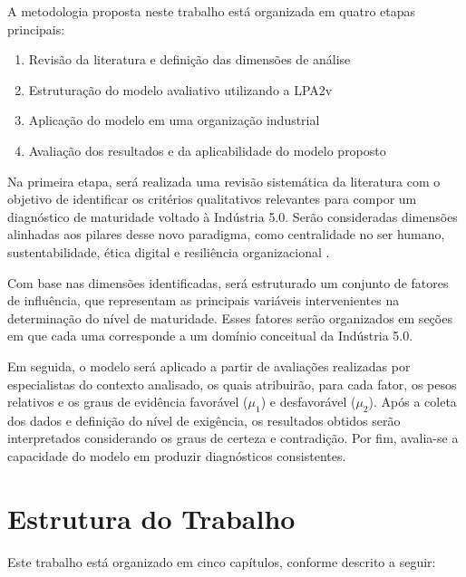 A metodologia proposta neste trabalho está organizada em quatro etapas principais:
\begin{enumerate}[label=\roman*.]
    \item Revisão da literatura e definição das dimensões de análise
    \item Estruturação do modelo avaliativo utilizando a \gls{LPA2v}
    \item Aplicação do modelo em uma organização industrial
    \item Avaliação dos resultados e da aplicabilidade do modelo proposto
\end{enumerate}

Na primeira etapa, será realizada uma revisão sistemática da literatura com o objetivo de identificar os critérios qualitativos relevantes para compor um diagnóstico de maturidade voltado à Indústria 5.0. Serão consideradas dimensões alinhadas aos pilares desse novo paradigma, como centralidade no ser humano, sustentabilidade, ética digital e resiliência organizacional \cite{euCommission2021}.

Com base nas dimensões identificadas, será estruturado um conjunto de fatores de influência, que representam as principais variáveis intervenientes na determinação do nível de maturidade. Esses fatores serão organizados em seções em que cada uma corresponde a um domínio conceitual da Indústria 5.0. 

Em seguida, o modelo será aplicado a partir de avaliações realizadas por especialistas do contexto analisado, os quais atribuirão, para cada fator, os pesos relativos e os graus de evidência favorável ($\mu_1$) e desfavorável ($\mu_2$). Após a coleta dos dados e definição do nível de exigência, os resultados obtidos serão interpretados considerando os graus de certeza e contradição. Por fim, avalia-se a capacidade do modelo em produzir diagnósticos consistentes.

\section{Estrutura do Trabalho}

Este trabalho está organizado em cinco capítulos, conforme descrito a seguir:

